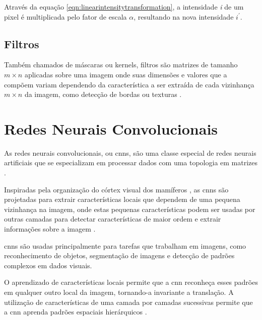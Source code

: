 Através da equação \ref{eqn:linearintensitytransformation}, a intensidade \textit{i} de um pixel é multiplicada pelo fator de escala $\alpha$, resultando na nova intensidade  $i^{'}$.

\subsection{Filtros}

Também chamados de máscaras ou kernels, filtros são matrizes de tamanho $m \times n$ aplicadas sobre uma imagem onde suas dimensões e valores que a compõem variam dependendo da característica
a ser extraída de cada vizinhança $m \times n$ da imagem, como detecção de bordas ou texturas \cite{shapiro}.
\section{Redes Neurais Convolucionais}

As redes neurais convolucionais, ou \acrshort{cnn}s, são uma classe especial de redes neurais artificiais que se especializam em processar dados com uma topologia em matrizes \cite{Goodfellow-et-al-2016}. 

Inspiradas pela organização do córtex visual dos mamíferos \cite{hubel1962}, as \acrshort{cnn}s são projetadas para 
extrair características locais que dependem de uma pequena vizinhança na imagem, onde estas pequenas características podem ser usadas por outras camadas para detectar características de maior ordem e extrair informações sobre a imagem \cite{book:Bishop}. 

\acrshort{cnn}s são usadas principalmente para tarefas que trabalham em imagens, como reconhecimento de objetos, segmentação de imagens e detecção de padrões complexos em dados visuais.

O aprendizado de características locais permite que a \acrshort{cnn} reconheça esses padrões em qualquer outro local da imagem,  tornando-a invariante a translação. A utilização de características de uma camada por camadas sucessivas permite que a \acrshort{cnn} aprenda padrões espaciais hierárquicos \cite{book:Chollet}.


